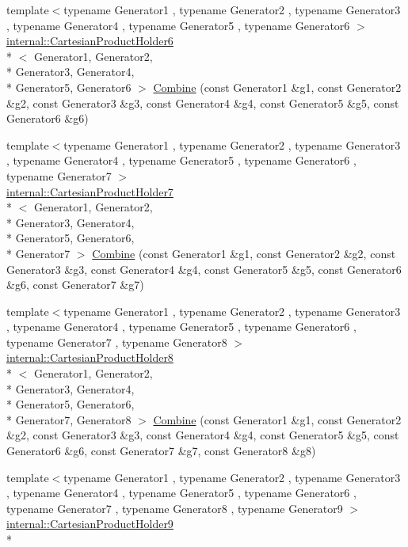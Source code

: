\begin{DoxyCompactItemize}
{\footnotesize template$<$typename Generator1 , typename Generator2 , typename Generator3 , typename Generator4 , typename Generator5 , typename Generator6 $>$ }\\\hyperlink{classtesting_1_1internal_1_1CartesianProductHolder6}{internal\-::\-Cartesian\-Product\-Holder6}\\*
$<$ Generator1, Generator2, \\*
Generator3, Generator4, \\*
Generator5, Generator6 $>$ \hyperlink{namespacetesting_adccda33f9b3ad18896cb341979fe12b4}{Combine} (const Generator1 \&g1, const Generator2 \&g2, const Generator3 \&g3, const Generator4 \&g4, const Generator5 \&g5, const Generator6 \&g6)
\item 
{\footnotesize template$<$typename Generator1 , typename Generator2 , typename Generator3 , typename Generator4 , typename Generator5 , typename Generator6 , typename Generator7 $>$ }\\\hyperlink{classtesting_1_1internal_1_1CartesianProductHolder7}{internal\-::\-Cartesian\-Product\-Holder7}\\*
$<$ Generator1, Generator2, \\*
Generator3, Generator4, \\*
Generator5, Generator6, \\*
Generator7 $>$ \hyperlink{namespacetesting_a314759a93c251ca78b75c7f3ae8eda80}{Combine} (const Generator1 \&g1, const Generator2 \&g2, const Generator3 \&g3, const Generator4 \&g4, const Generator5 \&g5, const Generator6 \&g6, const Generator7 \&g7)
\item 
{\footnotesize template$<$typename Generator1 , typename Generator2 , typename Generator3 , typename Generator4 , typename Generator5 , typename Generator6 , typename Generator7 , typename Generator8 $>$ }\\\hyperlink{classtesting_1_1internal_1_1CartesianProductHolder8}{internal\-::\-Cartesian\-Product\-Holder8}\\*
$<$ Generator1, Generator2, \\*
Generator3, Generator4, \\*
Generator5, Generator6, \\*
Generator7, Generator8 $>$ \hyperlink{namespacetesting_ac5508abb9d05e22332c792d101c13b2b}{Combine} (const Generator1 \&g1, const Generator2 \&g2, const Generator3 \&g3, const Generator4 \&g4, const Generator5 \&g5, const Generator6 \&g6, const Generator7 \&g7, const Generator8 \&g8)
\item 
{\footnotesize template$<$typename Generator1 , typename Generator2 , typename Generator3 , typename Generator4 , typename Generator5 , typename Generator6 , typename Generator7 , typename Generator8 , typename Generator9 $>$ }\\\hyperlink{classtesting_1_1internal_1_1CartesianProductHolder9}{internal\-::\-Cartesian\-Product\-Holder9}\\*

\end{DoxyCompactItemize}

